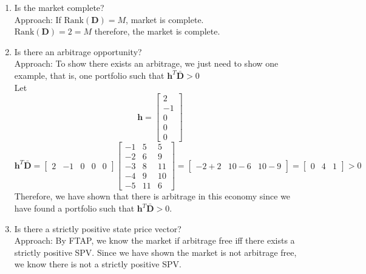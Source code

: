 \documentclass[11pt]{article}
\begin{document}
\begin{enumerate}
    \item Is the market complete? \\
    Approach: If $\text{Rank}(\boldsymbol{D}) = M$, market is complete. \\
    $\text{Rank}(\boldsymbol{D}) = 2 = M$ therefore, the market is complete.
    \item Is there an arbitrage opportunity? \\
    Approach: To show there exists an arbitrage, we just need to show one example, that is, one
    portfolio such that $\boldsymbol{h}^T \boldsymbol{\bar{D}} > 0$ \\ 

    Let 
    \[
    \boldsymbol{h} = \begin{bmatrix}
        2 \\
        -1 \\ 
        0 \\ 
        0 \\ 
        0
    \end{bmatrix}
    \]
    \[
    \boldsymbol{h}^T \boldsymbol{\bar{D}} = 
    \begin{bmatrix}
        2 & -1 & 0 & 0 & 0 
    \end{bmatrix}
    \begin{bmatrix}
        -1 & 5 & 5 \\ 
        -2 & 6 & 9 \\ 
        -3 & 8 & 11 \\ 
        -4 & 9 & 10 \\ 
        -5 & 11 & 6 
    \end{bmatrix} =
    \begin{bmatrix}
        -2+2 & 10-6 & 10-9
    \end{bmatrix} =
    \begin{bmatrix}
        0 & 4 & 1
    \end{bmatrix} > 0
    \]
    Therefore, we have shown that there is arbitrage in this economy since we have found a 
    portfolio such that $\boldsymbol{h}^T \boldsymbol{\bar{D}} > 0$.
    \item Is there a strictly positive state price vector? \\
    Approach: By FTAP, we know the market if arbitrage free iff there exists a strictly
    positive SPV. Since we have shown the market is not arbitrage free, we know there is not a 
    strictly positive SPV. 
\end{enumerate}
\end{document}
